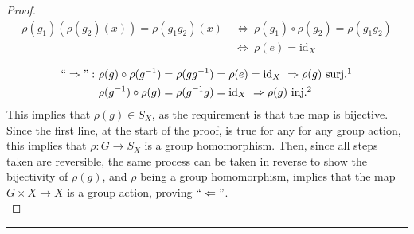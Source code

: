 \documentclass{article}
\theoremstyle{definition}
\theoremstyle{remark}
\begin{document}
\begin{proof}
	\begin{align*}
		\rho (g_1)(\rho(g_2)(x))=\rho(g_1g_2)(x)~ & \Leftrightarrow ~\rho(g_1)\circ\rho(g_2)=\rho(g_1g_2) \\&\Leftrightarrow ~\rho(e)=\mathrm{id}_X
	\end{align*}

	\begin{align*}
		``\Rightarrow":~ & \rho(g)\circ\rho(g^{-1})=\rho(gg^{-1})=\rho(e)=\mathrm{id}_X ~\Rightarrow\rho(g)\text{ surj.}\footnotemark \\ &\rho(g^{-1})\circ\rho(g)=\rho(g^{-1}g)=\mathrm{id}_X~\Rightarrow\rho(g)\text{ inj.}\footnotemark
	\end{align*}
	This implies that $\rho(g)\in S_X$, as the requirement is that the map is bijective. Since the first line, at the start of the proof, is true for any for any group action, this implies that $\rho:G\rightarrow S_X$ is a group homomorphism. Then, since all steps taken are reversible, the same process can be taken in reverse to show the bijectivity of $\rho(g)$, and $\rho$ being a group homomorphism, implies that the map $G\times X\rightarrow X$ is a group action, proving $``\Leftarrow"$. \\
\end{proof}
\hrule
\vspace{2mm}
\end{document}
